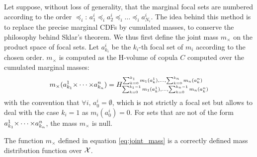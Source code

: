 Let suppose, without loss of generality, that the marginal focal sets are numbered according to the order $\preceq_i$: $a^i_1\preceq_ia^i_2\preceq_i\dots\preceq_i a^i_{N_i}$. The idea behind this method is to replace the precise marginal CDFs by cumulated masses, to conserve the philosophy behind Sklar's theorem. We thus first define the joint mass $m_\times$ on the product space of focal sets. Let $a_{k_i}^i$ be the $k_i$-th focal set of $m_i$ according to the chosen order. $m_\times$ is computed as the H-volume of copula $C$ computed over the cumulated marginal masses:
\begin{eqnarray}\label{eq:joint_mass}
    m_\times(a^1_{k_1}{\times\dots\times} a^n_{k_n}) = H_{\sum_{k=0}^{k_1-1}m_1(a^1_k), \dots, \sum_{k=0}^{k_n-1}m_n(a^n_k)}^{\sum_{k=0}^{k_1}m_1(a^1_k), \dots, \sum_{k=0}^{k_n}m_n(a^n_k)}
\end{eqnarray}
with the convention that $\forall i,\, a^i_0=\emptyset$, which is not strictly a focal set but allows to deal with the case $k_i=1$ as $m_i(a^i_0)=0$. For sets that are not of the form $a^1_{k_1}{\times\dots\times} a^n_{k_n}$, the mass $m_\times$ is null.
\begin{proposition}
    The function $m_\times$ defined in equation \eqref{eq:joint_mass} is a correctly defined mass distribution function over ${\mathcal{X}}$. 
\end{proposition}
